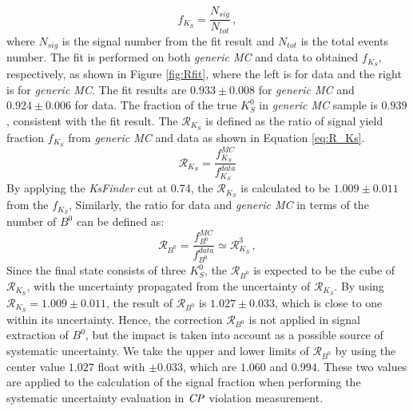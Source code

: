 \begin{equation}\label{eq:S_ratio}
	f_{K_S} = \frac{N_{sig}}{N_{tot}}\, ,
\end{equation}
where $N_{sig}$ is the signal number from the fit result and $N_{tot}$ is the total events number.
The fit is performed on both \textit{generic MC} and data to obtained $f_{K_S} $, respectively, as shown in Figure \ref{fig:Rfit}, where the left is for data and the right is for \textit{generic MC}. The fit results are $0.933\pm0.008$ for \textit{generic MC} and $0.924\pm 0.006$ for data. The fraction of the true $K_S^0$ in \textit{generic MC} sample is $0.939$, consistent with the fit result.
The $\mathcal{R}_{K_S}$ is defined as the ratio of signal yield fraction  $f_{K_S} $ from \textit{generic MC} and data as shown in Equation \ref{eq:R_Ks}. 
\begin{equation}\label{eq:R_Ks}
\mathcal{R}_{K_S} = \frac{f_{K_S}^{MC}}{f_{K_S}^{data}}
\end{equation}
By applying the \textit{KsFinder} cut at 0.74, the $\mathcal{R}_{K_S}$ is calculated to be $1.009\pm 0.011$ from the $f_{K_S}$,  Similarly, the ratio for data and \textit{generic MC} in terms of the number of $B^0$ can be defined as: 
\begin{equation}\label{eq:R_B}
\mathcal{R}_{B^0} = \frac{f_{B^0}^{MC}}{f_{B^0}^{data}} \simeq \mathcal{R}_{K_S}^3 \, ,
\end{equation}
Since the final state consists of three $K_S^0$, the $\mathcal{R}_{B^0}$ is expected to be the cube of $\mathcal{R}_{K_S}$, with the uncertainty propagated from the uncertainty of $\mathcal{R}_{K_S}$. By using  $\mathcal{R}_{K_S} = 1.009\pm 0.011$, the result of $\mathcal{R}_{B^0}$ is $1.027 \pm 0.033$, which is close to one within its uncertainty. Hence, the correction $\mathcal{R}_{B^0}$ is not applied in signal extraction of $B^0$, but the impact is taken into account as a possible source of systematic uncertainty. We take the upper and lower limits of $\mathcal{R}_{B^0}$ by using the center value $1.027$ float with $\pm0.033$, which are $1.060$ and $0.994$. These two values are applied to the calculation of the signal fraction when performing the systematic uncertainty evaluation in $\it{CP}$ violation measurement.



